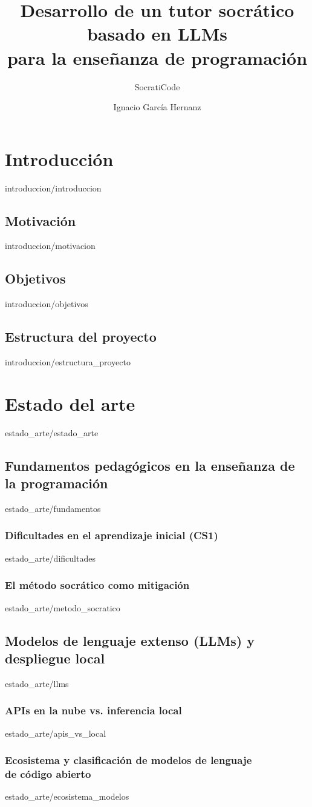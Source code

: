 \documentclass[epsbased,copyright,final,printable,covers,extendedindex,firstnumbered,tfg,gnuplot,lof,lot,loc]{tfgtfmthesisuam}
\title{Desarrollo de un tutor socrático basado en LLMs \\ para la enseñanza de programación}
\subtitle{SocratiCode}
\author{Ignacio García Hernanz}
\begin{document}
\chapter{Introducción\label{CAP:INTRO}}{introduccion/introduccion}
  \section{Motivación\label{SEC:INTRO_MOTIVACION}}{introduccion/motivacion}
  \section{Objetivos\label{SEC:INTRO_OBJETIVOS}}{introduccion/objetivos}
  \section{Estructura del proyecto\label{SEC:INTRO_ESTRUCTURA}}{introduccion/estructura_proyecto}

\chapter{Estado del arte\label{CAP:ESTADO_ARTE}}{estado_arte/estado_arte}
  \section{Fundamentos pedagógicos en la enseñanza de la programación\label{SEC:EA_FUNDAMENTOS}}{estado_arte/fundamentos}
    \subsection{Dificultades en el aprendizaje inicial (CS1)\label{SS:EA_FUND_DIFICULTADES}}{estado_arte/dificultades}
    \subsection{El método socrático como mitigación\label{SS:EA_FUND_SOCRATICO}}{estado_arte/metodo_socratico}
  \section{Modelos de lenguaje extenso (LLMs) y despliegue local\label{SEC:EA_LLMS}}{estado_arte/llms}
    \subsection{APIs en la nube vs. inferencia local\label{SS:EA_LLM_APIS}}{estado_arte/apis_vs_local}
    \subsection{Ecosistema y clasificación de modelos de lenguaje \\ de código abierto\label{SS:EA_LLM_ECOSISTEMA}}{estado_arte/ecosistema_modelos}
\end{document}
